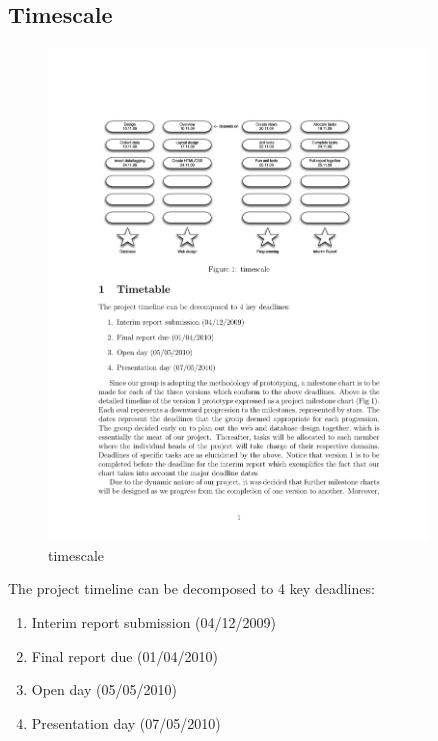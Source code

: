 \subsection{Timescale}
\begin{figure}
\includegraphics[width=0.9\textwidth]{timescale}
\caption{timescale}
\label{fig:time_scale}
\end{figure}

The project timeline can be decomposed to 4 key deadlines:
\begin{enumerate}
	\item Interim report submission (04/12/2009)
	\item Final report due (01/04/2010)
	\item Open day (05/05/2010)
	\item Presentation day (07/05/2010)

\end{enumerate}



